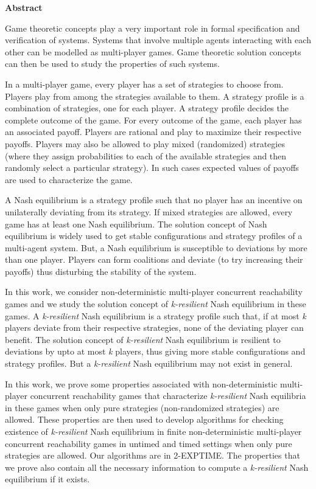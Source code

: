 \begin{center}
	\huge{\textbf{Abstract}}
\end{center}

Game theoretic concepts play a very important role in formal specification and verification of systems. Systems that involve multiple agents interacting with each other can be modelled as multi-player games. Game theoretic solution concepts can then be used to study the properties of such systems.

In a multi-player game, every player has a set of strategies to choose from. Players play from among the strategies available to them. A strategy profile is a combination of strategies, one for each player. A strategy profile decides the complete outcome of the game. For every outcome of the game, each player has an associated payoff. Players are rational and play to maximize their respective payoffs. Players may also be allowed to play mixed (randomized) strategies (where they assign probabilities to each of the available strategies and then randomly select a particular strategy). In such cases expected values of payoffs are used to characterize the game. 

A Nash equilibrium is a strategy profile such that no player has an incentive on unilaterally deviating from its strategy. If mixed strategies are allowed, every game has at least one Nash equilibrium. The solution concept of Nash equilibrium is widely used to get stable configurations and strategy profiles of a multi-agent system. But, a Nash equilibrium is susceptible to deviations by more than one player. Players can form coalitions and deviate (to try increasing their payoffs) thus disturbing the stability of the system.

In this work, we consider non-deterministic multi-player concurrent reachability games and we study the solution concept of \textit{k-resilient} Nash equilibrium in these games. A \textit{k-resilient} Nash equilibrium is a strategy profile such that, if at most \textit{k} players deviate from their respective strategies, none of the deviating player can benefit. The solution concept of \textit{k-resilient} Nash equilibrium is resilient to deviations by upto at most \textit{k} players, thus giving more stable configurations and strategy profiles. But a \textit{k-resilient} Nash equilibrium may not exist in general.

In this work, we prove some properties associated with non-deterministic multi-player concurrent reachability games that characterize \textit{k-resilient} Nash equilibria in these games when only pure strategies (non-randomized strategies) are allowed. These properties are then used to develop algorithms for checking existence of \textit{k-resilient} Nash equilibrium in finite non-deterministic multi-player concurrent reachability games in untimed and timed settings when only pure strategies are allowed. Our algorithms are in 2-EXPTIME. The properties that we prove also contain all the necessary information to compute a \textit{k-resilient} Nash equilibrium if it exists.